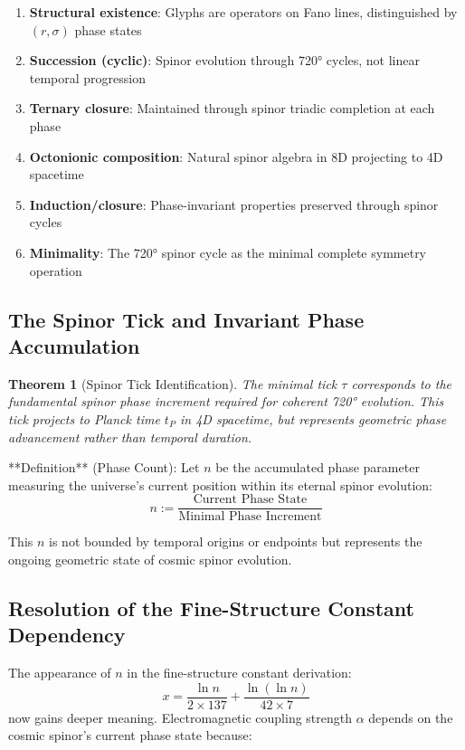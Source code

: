 \documentclass[pdflatex,sn-mathphys-num]{sn-jnl}
\theoremstyle{thmstyleone}
\newtheorem{theorem}{Theorem}
\theoremstyle{thmstyletwo}
\theoremstyle{thmstylethree}
\begin{document}
\begin{appendices}
\begin{enumerate}
\item \textbf{Structural existence}: Glyphs are operators on Fano lines, distinguished by $(r, \sigma)$ phase states
\item \textbf{Succession (cyclic)}: Spinor evolution through 720° cycles, not linear temporal progression  
\item \textbf{Ternary closure}: Maintained through spinor triadic completion at each phase
\item \textbf{Octonionic composition}: Natural spinor algebra in 8D projecting to 4D spacetime
\item \textbf{Induction/closure}: Phase-invariant properties preserved through spinor cycles
\item \textbf{Minimality}: The 720° spinor cycle as the minimal complete symmetry operation
\end{enumerate}

\subsection{The Spinor Tick and Invariant Phase Accumulation}

\begin{theorem}[Spinor Tick Identification]
The minimal tick $\tau$ corresponds to the fundamental spinor phase increment required for coherent 720° evolution. This tick projects to Planck time $t_P$ in 4D spacetime, but represents geometric phase advancement rather than temporal duration.
\end{theorem}

**Definition** (Phase Count): Let $n$ be the accumulated phase parameter measuring the universe's current position within its eternal spinor evolution:
\begin{equation}
n := \frac{\text{Current Phase State}}{\text{Minimal Phase Increment}}
\end{equation}

This $n$ is not bounded by temporal origins or endpoints but represents the ongoing geometric state of cosmic spinor evolution.

\subsection{Resolution of the Fine-Structure Constant Dependency}

The appearance of $n$ in the fine-structure constant derivation:
\begin{equation}
x = \frac{\ln n}{2 \times 137} + \frac{\ln(\ln n)}{42 \times 7}
\end{equation}
now gains deeper meaning. Electromagnetic coupling strength $\alpha$ depends on the cosmic spinor's current phase state because:


\end{appendices}
\end{document}
